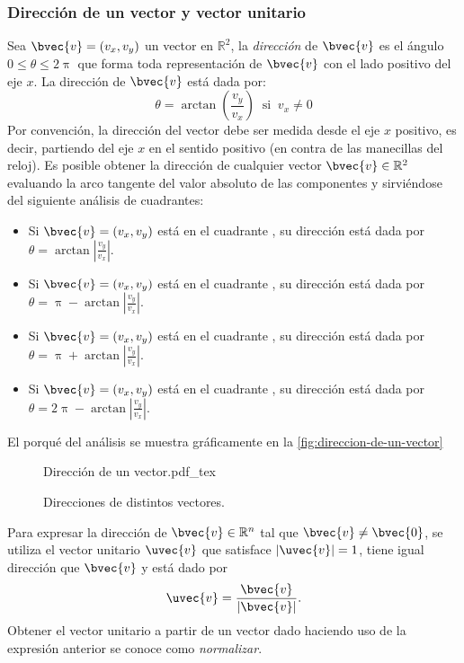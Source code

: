 \documentclass{fmbnotes}
\begin{document}
\subsubsection{Dirección de un vector y vector unitario}
Sea \( \bvec{v} = (v_x,v_y) \) un vector en \( \mathbb{R}^{2} \), la \emph{dirección} de \( \bvec{v} \) es el ángulo \(0 \leq \theta \leq 2\uppi\) que forma toda representación de \( \bvec{v} \) con el lado positivo del eje \( x \). La dirección de \( \bvec{v} \) está dada por:
\[\theta=\arctan\left(\frac{v_y}{v_x}\right) \: \text{ si } \: v_x \neq 0\]
Por convención, la dirección del vector debe ser medida desde el eje \( x \) positivo, es decir, partiendo del eje \( x \) en el sentido positivo (en contra de las manecillas del reloj). Es posible obtener la dirección de cualquier vector \(\bvec{v} \in \mathbb{R}^{2} \) evaluando la arco tangente del valor absoluto de las componentes y sirviéndose del siguiente análisis de cuadrantes:
\begin{itemize}
\item Si \( \bvec{v} = (v_x,v_y) \) está en el cuadrante , su dirección está dada por \( \theta = \arctan \left|\frac{v_y}{v_x}\right| \).
\item Si \( \bvec{v} = (v_x,v_y) \) está en el cuadrante , su dirección está dada por \( \theta = \uppi - \arctan \left|\frac{v_y}{v_x}\right| \).
\item Si \( \bvec{v} = (v_x,v_y) \) está en el cuadrante , su dirección está dada por \( \theta = \uppi + \arctan \left|\frac{v_y}{v_x}\right| \).
\item Si \( \bvec{v} = (v_x,v_y) \) está en el cuadrante , su dirección está dada por \( \theta = 2\uppi - \arctan \left|\frac{v_y}{v_x}\right| \).
\end{itemize}
El porqué del análisis se muestra gráficamente en la \autoref{fig:direccion-de-un-vector}
\begin{figure}[h]
\centering
{Dirección de un vector.pdf_tex}
\caption{Direcciones de distintos vectores.}
\label{fig:direccion-de-un-vector}
\end{figure}

Para expresar la dirección de \( \bvec{v} \in \mathbb{R}^{n}\) tal que \(\bvec{v} \neq \bvec{0}\), se utiliza el vector unitario \(\uvec{v}\) que satisface \(\left|\uvec{v}\right|=1\), tiene igual dirección que \( \bvec{v} \) y está dado por
\[\uvec{v}=\frac{\bvec{v}}{\left|\bvec{v}\right|}.\]
Obtener el vector unitario a partir de un vector dado haciendo uso de la expresión anterior se conoce como \emph{normalizar}.
\end{document}
